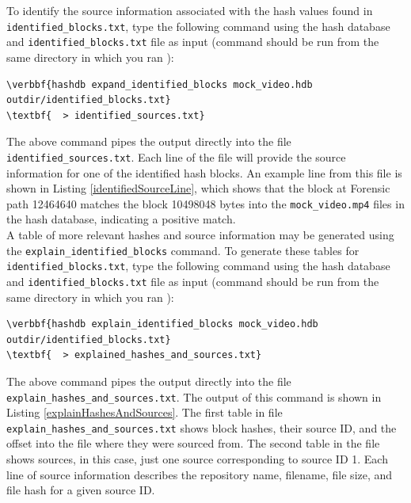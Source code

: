 \documentclass[11pt,fleqn]{article} %
\begin{document}
To identify the source information associated with the hash values found in \texttt{identified\_blocks.txt}, type the following command using the hash database and \texttt{identified\_blocks.txt} file as input (command should be run from the same directory in which you ran \bulk):
\begin{Verbatim}[commandchars=\\\{\}]
\verbbf{hashdb expand_identified_blocks mock_video.hdb outdir/identified_blocks.txt} 
\textbf{  > identified_sources.txt}
\end{Verbatim}
The above command pipes the output directly into the file \texttt{identified\_sources.txt}. Each line of the file will provide the source information for one of the identified hash blocks. An example line from this file is shown in Listing \ref{identifiedSourceLine},
which shows that the block at Forensic path 12464640 matches the block 10498048 bytes into the \texttt{mock\_video.mp4} files in the hash database, indicating a positive match.\\

A table of more relevant hashes and source information may be generated using the \verb+explain_identified_blocks+ command.
To generate these tables for \texttt{identified\_blocks.txt}, type the following command using the hash database and \texttt{identified\_blocks.txt} file as input (command should be run from the same directory in which you ran \bulk):
\begin{Verbatim}[commandchars=\\\{\}]
\verbbf{hashdb explain_identified_blocks mock_video.hdb outdir/identified_blocks.txt} 
\textbf{  > explained_hashes_and_sources.txt}
\end{Verbatim}
The above command pipes the output directly into the file \texttt{explain\_hashes\_and\_sources.txt}.
The output of this command is shown in Listing \ref{explainHashesAndSources}.
The first table in file \texttt{explain\_hashes\_and\_sources.txt}
shows block hashes, their source ID, and the offset into the file where they were sourced from.
The second table in the file shows sources, in this case, just one source corresponding to source ID 1.
Each line of source information describes
the repository name, filename, file size, and file hash for a given source ID.\\
\end{document}
